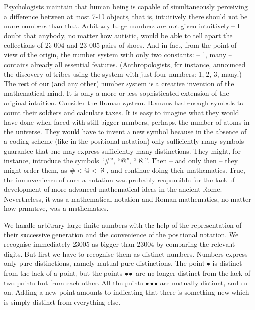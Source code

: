 Psychologists maintain that human being is capable of simultaneously perceiving 
a difference between at most 7-10 objects, that is, intuitively there should not
 be more numbers than that. Arbitrary large numbers are not given intuitively --
 I doubt that anybody, no matter how autistic, would be able to tell apart the 
collections of 23 004 and 23 005 pairs of shoes. And in fact, from the point of 
view of the origin, the number system with only two constants: -- 1, many -- 
contains already all essential features. (Anthropologists, for instance, 
announced the discovery of tribes using the system with just four numbers: 1, 2,
 3, many.) The rest of our (and any other) number system is a creative invention
 of the mathematical mind. It is only a more or less sophisticated extension of 
the original intuition. Consider the Roman system. Romans had enough symbols to 
count their soldiers and calculate taxes. It is easy to imagine what they would 
have done when faced with still bigger numbers, perhaps, the number of atoms in 
the universe. They would have to invent a new symbol because in the absence of a
 coding scheme (like in the positional notation) only sufficiently many symbols 
guarantee that one may express sufficiently many distinctions. They might, for 
instance, introduce the symbols ``\#'', ``@'', ``$\aleph$''. 
Then -- and only then -- they might order them, 
as $\# < @ < \aleph$, and continue doing their mathematics. True, the inconvenience of 
such a notation was probably responsible for the lack of development of more 
advanced mathematical ideas in the ancient Rome. Nevertheless, it was a 
mathematical notation and Roman mathematics, no matter how primitive, was a 
mathematics.

We handle arbitrary large finite numbers with the help of the representation of their successive generation and the convenience of the positional notation. We recognise immediately  23005 as bigger than 23004 by comparing the relevant digits. But first we have to recognise them as distinct numbers. Numbers express only pure distinctions, namely mutual pure distinctions. The point $\bullet$
is distinct from the lack of a point, but the points $\bullet\bullet$ are no longer distinct from the lack of two points but from each other. All the points 
$\bullet\bullet\bullet$ are mutually distinct, and so on. Adding a new point amounts to indicating that there is something new which is simply distinct from everything else. 

